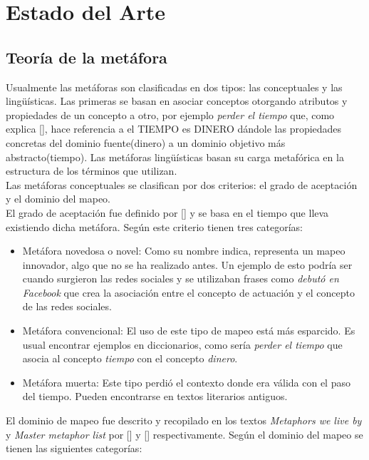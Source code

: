 \chapter{Estado del Arte}\label{chapter:state-of-the-art}
\section{Teoría de la metáfora}
Usualmente las metáforas son clasificadas en dos tipos: las conceptuales y las lingüísticas. Las primeras se basan en asociar conceptos otorgando atributos y propiedades de un concepto a otro, por ejemplo \textit{perder el tiempo} que, como explica [\cite{Lakoff}], hace referencia a el TIEMPO es DINERO dándole las propiedades concretas del dominio fuente(dinero) a un dominio objetivo más abstracto(tiempo). Las metáforas lingüísticas basan su carga metafórica en la estructura de los términos que utilizan.\\
Las metáforas conceptuales se clasifican por dos criterios: el grado de aceptación y el dominio del mapeo. \\
El grado de aceptación fue definido por [\cite{Nunberg}] y se basa en el tiempo que lleva existiendo dicha metáfora. Según este criterio tienen tres categorías:
\begin{itemize}
\item Metáfora novedosa o novel: Como su nombre indica, representa un mapeo innovador, algo que no se ha realizado antes. Un ejemplo de esto podría ser cuando surgieron las redes sociales y se utilizaban frases como \textit{debutó en Facebook} que crea la asociación entre el concepto de actuación y el concepto de las redes sociales.
\item Metáfora convencional: El uso de este tipo de mapeo está más esparcido. Es usual encontrar ejemplos en diccionarios, como sería \textit{perder el tiempo} que asocia al concepto \textit{tiempo} con el concepto \textit{dinero}.
\item Metáfora muerta: Este tipo perdió el contexto donde era válida con el paso del tiempo. Pueden encontrarse en textos literarios antiguos.
\end{itemize}
El dominio de mapeo fue descrito y recopilado en los textos \textit{Metaphors we live by} y \textit{Master metaphor list} por [\cite{LakoffetAl}] y [\cite{Lakoff}] respectivamente. Según el dominio del mapeo se tienen las siguientes categorías:
